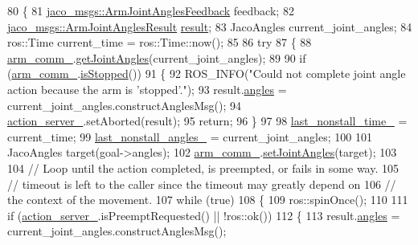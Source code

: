 \begin{DoxyCode}
80 \{
81     \hyperlink{structjaco__msgs_1_1ArmJointAnglesFeedback__}{jaco\_msgs::ArmJointAnglesFeedback} feedback;
82     \hyperlink{structjaco__msgs_1_1ArmJointAnglesResult__}{jaco\_msgs::ArmJointAnglesResult} \hyperlink{Kinova_8API_8CommLayerUbuntu_8h_a900dac90961bada00f57c207562a6a9a}{result};
83     JacoAngles current\_joint\_angles;
84     ros::Time current\_time = ros::Time::now();
85 
86     \textcolor{keywordflow}{try}
87     \{
88         \hyperlink{classjaco_1_1JacoAnglesActionServer_a72ed0ccae4532199d387cc3bfe278cb0}{arm\_comm\_}.\hyperlink{classjaco_1_1JacoComm_a5fcb23bf6925a82f2ab5e42460ea3834}{getJointAngles}(current\_joint\_angles);
89 
90         \textcolor{keywordflow}{if} (\hyperlink{classjaco_1_1JacoAnglesActionServer_a72ed0ccae4532199d387cc3bfe278cb0}{arm\_comm\_}.\hyperlink{classjaco_1_1JacoComm_a872b8033cda5a9fe4ccdca2e89aa03d1}{isStopped}())
91         \{
92             ROS\_INFO(\textcolor{stringliteral}{"Could not complete joint angle action because the arm is 'stopped'."});
93             result.\hyperlink{structjaco__msgs_1_1ArmJointAnglesResult___a5b6fe64a0d822194474af38863a9f8a2}{angles} = current\_joint\_angles.constructAnglesMsg();
94             \hyperlink{classjaco_1_1JacoAnglesActionServer_a29d204d1bff466987e69761085a3c532}{action\_server\_}.setAborted(result);
95             \textcolor{keywordflow}{return};
96         \}
97 
98         \hyperlink{classjaco_1_1JacoAnglesActionServer_afca8c9e29d0249737632a232e149400d}{last\_nonstall\_time\_} = current\_time;
99         \hyperlink{classjaco_1_1JacoAnglesActionServer_adb99422d834b8a2fa5f26ddd3ac95e52}{last\_nonstall\_angles\_} = current\_joint\_angles;
100 
101         JacoAngles target(goal->angles);
102         \hyperlink{classjaco_1_1JacoAnglesActionServer_a72ed0ccae4532199d387cc3bfe278cb0}{arm\_comm\_}.\hyperlink{classjaco_1_1JacoComm_ad53fa0c190d41da8430de2e9bf997f05}{setJointAngles}(target);
103 
104         \textcolor{comment}{// Loop until the action completed, is preempted, or fails in some way.}
105         \textcolor{comment}{// timeout is left to the caller since the timeout may greatly depend on}
106         \textcolor{comment}{// the context of the movement.}
107         \textcolor{keywordflow}{while} (\textcolor{keyword}{true})
108         \{
109             ros::spinOnce();
110 
111             \textcolor{keywordflow}{if} (\hyperlink{classjaco_1_1JacoAnglesActionServer_a29d204d1bff466987e69761085a3c532}{action\_server\_}.isPreemptRequested() || !ros::ok())
112             \{
113                 result.\hyperlink{structjaco__msgs_1_1ArmJointAnglesResult___a5b6fe64a0d822194474af38863a9f8a2}{angles} = current\_joint\_angles.constructAnglesMsg();

\end{DoxyCode}
